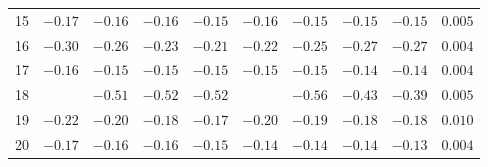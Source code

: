\begin{tabular}{@{}l cccc cccc r@{}}
15 & $-0.17$ & $-0.16$ & $-0.16$ & $-0.15$ & $-0.16$ & $-0.15$ & $-0.15$ & $-0.15$ & $0.005$ \\
16 & $-0.30$ & $-0.26$ & $-0.23$ & $-0.21$ & $-0.22$ & $-0.25$ & $-0.27$ & $-0.27$ & $0.004$ \\
17 & $-0.16$ & $-0.15$ & $-0.15$ & $-0.15$ & $-0.15$ & $-0.15$ & $-0.14$ & $-0.14$ & $0.004$ \\
\cmidrule{1-10}
18 &         & $-0.51$ & $-0.52$ & $-0.52$ &         & $-0.56$ & $-0.43$ & $-0.39$ & $0.005$ \\
19 & $-0.22$ & $-0.20$ & $-0.18$ & $-0.17$ & $-0.20$ & $-0.19$ & $-0.18$ & $-0.18$ & $0.010$ \\
20 & $-0.17$ & $-0.16$ & $-0.16$ & $-0.15$ & $-0.14$ & $-0.14$ & $-0.14$ & $-0.13$ & $0.004$ \\
\bottomrule
\end{tabular}
